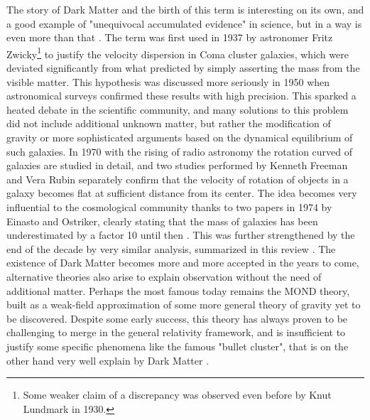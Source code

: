 The story of Dark Matter and the birth of this term is interesting on its own, and a good example of "unequivocal accumulated evidence" in science, but in a way is even more than that \cite{hooper, deSwart:2017heh}. The term was first used in 1937 by astronomer Fritz Zwicky\footnote{Some weaker claim of a discrepancy was observed even before by Knut Lundmark in 1930.} to justify the velocity dispersion in Coma cluster galaxies, which were deviated significantly from what predicted by simply asserting the mass from the visible matter. This hypothesis was discussed more seriously in 1950 when astronomical surveys confirmed these results with high precision. This sparked a heated debate in the scientific community, and many solutions to this problem did not include additional unknown matter, but rather the modification of gravity or more sophisticated arguments based on the dynamical equilibrium of such galaxies. In 1970 with the rising of radio astronomy the rotation curved of galaxies are studied in detail, and two studies performed by Kenneth Freeman and Vera Rubin separately confirm that the velocity of rotation of objects in a galaxy becomes flat at sufficient distance from its center. The idea becomes very influential to the cosmological community thanks to two papers in 1974 by Einasto and Ostriker, clearly stating that the mass of galaxies has been underestimated by a factor 10 until then \cite{EINASTO1974,1974ApJ...193L...1O}. This was further strengthened by the end of the decade by very similar analysis, summarized in this review \cite{annurev.aa.17.090179.001031}. The existence of Dark Matter becomes more and more accepted in the years to come, alternative theories also arise to explain observation without the need of additional matter. Perhaps the most famous today remains the MOND theory, built as a weak-field approximation of some more general theory of gravity yet to be discovered. Despite some early success, this theory has always proven to be challenging to merge in the general relativity framework, and is insufficient to justify some specific phenomena like the famous "bullet cluster", that is on the other hand very well explain by Dark Matter \cite{Clowe_2006}.

